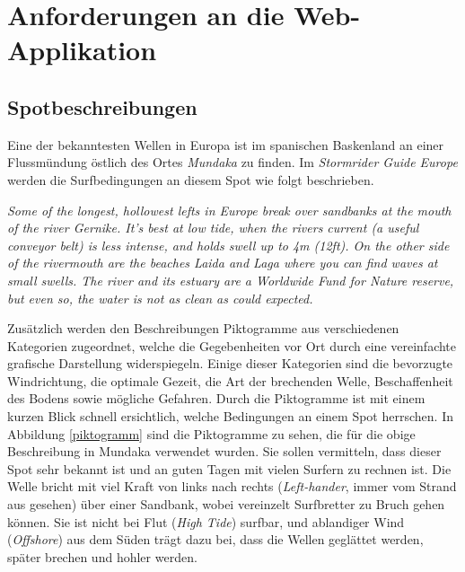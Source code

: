
\chapter{Anforderungen an die Web-Applikation}

\section{Spotbeschreibungen}

Eine der bekanntesten Wellen in Europa ist im spanischen Baskenland an
einer Fluss\-mündung östlich des Ortes \textit{Mundaka} zu finden. Im
\textit{Stormrider Guide Europe} \cite[S.180]{storm_europe_1998}
werden die Surfbedingungen an diesem Spot wie folgt beschrieben.

\vspace{0.2cm}

\textit{Some of the longest, hollowest lefts in Europe break over
  sandbanks at the mouth of the river Gernike. It's best at low tide,
  when the rivers current (a useful conveyor belt) is less intense,
  and holds swell up to 4m (12ft). On the other side of the rivermouth
  are the beaches Laida and Laga where you can find waves at small
  swells. The river and its estuary are a Worldwide Fund for Nature
  reserve, but even so, the water is not as clean as could expected.
}

\vspace{0.2cm}

Zusätzlich werden den Beschreibungen Piktogramme aus verschiedenen
Kategorien zugeordnet, welche die Gegebenheiten vor Ort durch eine
vereinfachte grafische Darstellung widerspiegeln. Einige dieser
Kategorien sind die bevorzugte Windrichtung, die optimale Gezeit, die
Art der brechenden Welle, Beschaffenheit des Bodens sowie mögliche
Gefahren. Durch die Piktogramme ist mit einem kurzen Blick schnell
ersichtlich, welche Bedingungen an einem Spot herrschen. In Abbildung
\ref{piktogramm} sind die Piktogramme zu sehen, die für die obige
Beschreibung in Mundaka verwendet wurden. Sie sollen vermitteln, dass
dieser Spot sehr bekannt ist und an guten Tagen mit vielen Surfern zu
rechnen ist. Die Welle bricht mit viel Kraft von links nach rechts
(\textit{Left-hander}, immer vom Strand aus gesehen) über einer
Sandbank, wobei vereinzelt Surfbretter zu Bruch gehen können.  Sie ist
nicht bei Flut (\textit{High Tide}) surfbar, und ablandiger Wind
(\textit{Offshore}) aus dem Süden trägt dazu bei, dass die Wellen
geglättet werden, später brechen und hohler werden.

